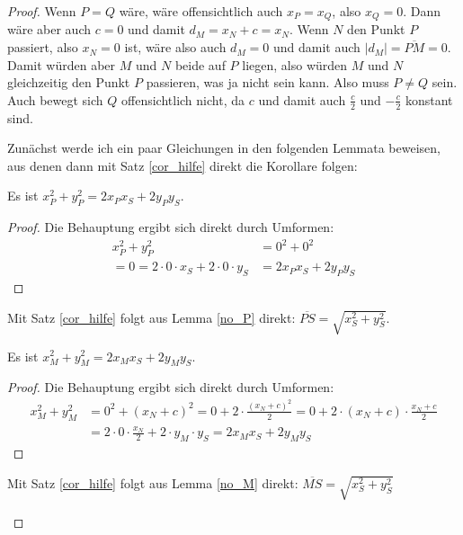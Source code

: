 \begin{proof}
    \renewcommand{\qedsymbol}{$\square$}
    Wenn $P=Q$ wäre, wäre offensichtlich auch $x_P=x_Q$, also $x_Q=0$. Dann wäre aber auch $c=0$ und damit $d_M
    =x_N+c=x_N$. Wenn $N$ den Punkt $P$ passiert, also $x_N=0$ ist, wäre also auch $d_M=0$ und damit auch $|d_M|
    =\overline{PM}=0$. Damit  würden aber $M$ und $N$ beide auf $P$ liegen, also würden $M$ und $N$ gleichzeitig 
    den Punkt $P$ passieren, was ja nicht sein kann. Also muss $P\neq Q$ sein. Auch bewegt sich $Q$ offensichtlich 
    nicht, da $c$ und damit auch $\frac{c}{2}$ und $-\frac{c}{2}$ konstant sind.
    
    Zunächst werde ich ein paar Gleichungen in den folgenden Lemmata beweisen, aus denen dann mit Satz \ref{cor_hilfe}
    direkt die Korollare folgen:
    \begin{lem}\label{no_P}
        Es ist $x_P^2+y_P^2=2x_Px_S+2y_Py_S$.
    \end{lem}
    \begin{proof}
        Die Behauptung ergibt sich direkt durch Umformen:
        \begin{align*}
            x_P^2+y_P^2&=0^2+0^2\\
            =0=2\cdot 0\cdot x_S+2\cdot 0\cdot y_S&=2x_Px_S+2y_Py_S
        \end{align*}
    \end{proof}
    \begin{cor}\label{noc_P}
        Mit Satz \ref{cor_hilfe} folgt aus Lemma \ref{no_P} direkt: $\overline{PS}=\sqrt{x_S^2+y_S^2}$.
    \end{cor}
    \begin{lem}\label{no_M}
        Es ist $x_M^2+y_M^2=2x_Mx_S+2y_My_S$.
    \end{lem}
    \begin{proof}
        Die Behauptung ergibt sich direkt durch Umformen:
        \begin{align*}
            x_M^2+y_M^2&=0^2+(x_N+c)^2=0+2\cdot \frac{(x_N+c)^2}{2}=0+2\cdot (x_N+c)\cdot\frac{x_N+c}{2}\\
            &=2\cdot 0\cdot \frac{x_N}{2}+2\cdot y_M\cdot y_S=2x_Mx_S+2y_My_S
        \end{align*}
    \end{proof}
    \begin{cor}\label{noc_M}
        Mit Satz \ref{cor_hilfe} folgt aus Lemma \ref{no_M} direkt: $\overline{MS}=\sqrt{x_S^2+y_S^2}$
    \end{cor}
    \begin{lem}\label{no_N}

\end{lem}
\end{proof}
